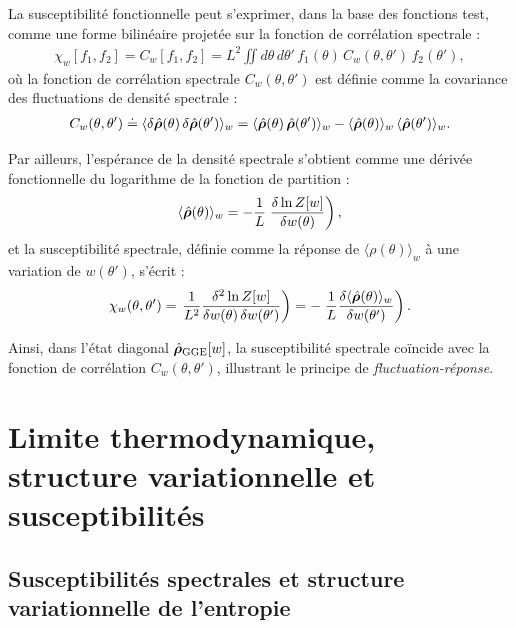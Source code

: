 La susceptibilité fonctionnelle peut s’exprimer, dans la base des fonctions test, comme une forme bilinéaire projetée sur la fonction de corrélation spectrale :
\begin{eqnarray*}
\chi_w[f_1, f_2] = C_w[f_1, f_2] = L^2 \iint d\theta\, d\theta'\, f_1(\theta)\, C_w(\theta, \theta')\, f_2(\theta'),
\end{eqnarray*}
où la fonction de corrélation spectrale \( C_w(\theta, \theta') \) est définie comme la covariance des fluctuations de densité spectrale :
\begin{eqnarray*}
C_w(\theta, \theta') \doteq \langle \delta \hat{\bm{\rho}}(\theta)\, \delta \hat{\bm{\rho}}(\theta') \rangle_w = \langle \hat{\bm{\rho}}(\theta)\, \hat{\bm{\rho}}(\theta') \rangle_w - \langle \hat{\bm{\rho}}(\theta) \rangle_w\, \langle \hat{\bm{\rho}}(\theta') \rangle_w.
\end{eqnarray*}

Par ailleurs, l’espérance de la densité spectrale s’obtient comme une dérivée fonctionnelle du logarithme de la fonction de partition :
\begin{eqnarray*}
\langle \hat{\bm{\rho}}(\theta) \rangle_w = - \frac{1}{L} \left. \frac{\delta \ln Z[w]}{\delta w(\theta)} \right),
\end{eqnarray*}
et la susceptibilité spectrale, définie comme la réponse de \( \langle \rho(\theta) \rangle_w \) à une variation de \( w(\theta') \), s’écrit :
\begin{eqnarray*}
\chi_w(\theta, \theta') = \left. \frac{1}{L^2} \frac{\delta^2 \ln Z[w]}{\delta w(\theta)\, \delta w(\theta')} \right) = - \left. \frac{1}{L} \frac{\delta \langle \hat{\bm{\rho}}(\theta) \rangle_w}{\delta w(\theta')} \right).
\end{eqnarray*}

Ainsi, dans l’état diagonal \( \hat{\bm{\rho}}_{\mathrm{GGE}}[w] \), la susceptibilité spectrale coïncide avec la fonction de corrélation \( C_w(\theta, \theta') \), illustrant le principe de \emph{fluctuation-réponse}.




\section{Limite thermodynamique, structure variationnelle et susceptibilités}

\subsection{Susceptibilités spectrales et structure variationnelle de l’entropie}

